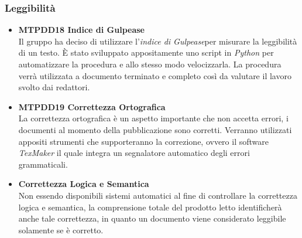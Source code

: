 \subsubsection{Leggibilità}
\begin{itemize}
	\item \textbf{MTPDD18 Indice di Gulpease}\-\\
Il gruppo ha deciso di utilizzare l'\textit{indice di Gulpease}\glossario per misurare la leggibilità di un testo. È stato sviluppato appositamente uno script in \textit{Python} per automatizzare la procedura e allo stesso modo velocizzarla. La procedura verrà utilizzata a documento terminato e completo così da valutare il lavoro svolto dai redattori.

	\item \textbf{MTPDD19 Correttezza Ortografica}\-\\
La correttezza ortografica è un aspetto importante che non accetta errori, i documenti al momento della pubblicazione sono corretti. Verranno utilizzati appositi strumenti che supporteranno la correzione, ovvero il software \textit{TexMaker} il quale integra un segnalatore automatico degli errori grammaticali. 

	\item \textbf{Correttezza Logica e Semantica} \-\\
Non essendo disponibili sistemi automatici al fine di controllare la correttezza logica e semantica, la comprensione totale del prodotto letto identificherà anche tale correttezza, in quanto un documento viene considerato leggibile solamente se è corretto.
\end{itemize}

